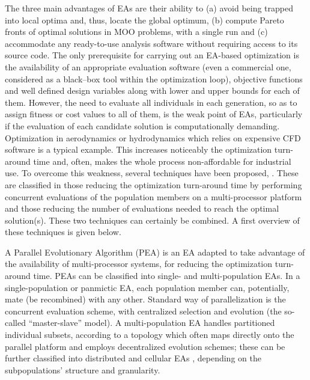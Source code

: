 The three main advantages of EAs are their ability to (a) avoid being trapped into local optima and, thus, locate the global optimum, (b) compute Pareto fronts of optimal solutions in MOO problems, with a single run and (c) accommodate any ready-to-use analysis software without requiring access to its source code. The only prerequisite for carrying out an EA-based optimization is the availability of an appropriate evaluation software (even a commercial one, considered as a black–box tool within the optimization loop), objective functions and well defined design variables along with lower and upper bounds for each of them. However, the need to evaluate all individuals in each generation, so as to assign fitness or cost values to all of them, is the weak point of EAs, particularly if the evaluation of each candidate solution is computationally demanding. Optimization in aerodynamics or hydrodynamics which relies on expensive CFD software is a typical example.  This increases noticeably the optimization turn-around time and, often, makes the whole process non-affordable for industrial use. To overcome this weakness, several techniques have been proposed, \cite{LTT_2_020,Jin2002}. These  are classified in those reducing the optimization turn-around time by performing concurrent evaluations of the population members on a multi-processor platform and those reducing the number of evaluations needed to reach the optimal solution(s). These two techniques can certainly be combined. A first overview of these techniques is given below.  

A Parallel Evolutionary Algorithm (PEA) \cite{phd_Giotis,phd_Karakasis,phd_Kampolis,phd_Vera} is an EA adapted to take advantage of the availability of multi-processor systems, for reducing the optimization turn-around time. PEAs can be classified into single- and multi-population EAs. In a single-population or panmictic EA, each population member can, potentially, mate (be recombined) with any other. Standard way of parallelization is the concurrent evaluation scheme, with centralized selection and evolution (the so-called ``master-slave'' model). A multi-population EA handles partitioned individual subsets, according to a topology which often maps directly onto the parallel platform and employs decentralized evolution schemes; these can be further classified into distributed \cite{LTT_2_023,Herr1999,LTT_2_044} and cellular EAs \cite{alba_08,Nebro:2009p48}, depending on the subpopulations’ structure and granularity. 

